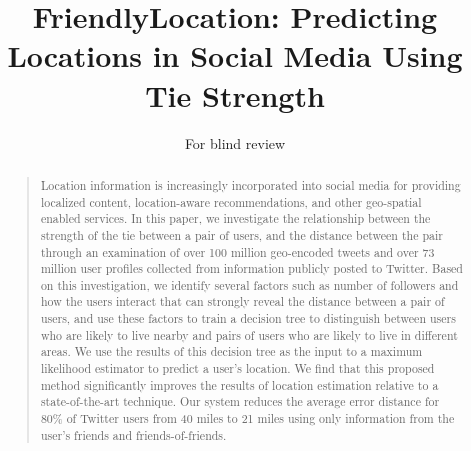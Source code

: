 \documentclass[letterpaper]{article}
\begin{document}
\title{FriendlyLocation: Predicting Locations in Social Media Using Tie Strength}
\author{For blind review}
\maketitle
\begin{abstract}
\begin{quote}
%
Location information is increasingly incorporated into social media for
providing localized content, location-aware recommendations, and other
geo-spatial enabled services.
%
In this paper, we investigate the relationship between the strength of the tie
between a pair of users, and the distance between the pair through an
examination of over 100 million geo-encoded tweets and
over 73 million user profiles collected from information publicly
posted to Twitter.
%
Based on this investigation, we identify several factors such as number of
followers and how the users interact that can strongly reveal the distance
between a pair of users, and use these factors to train a decision tree to
distinguish between users who are likely to live nearby and pairs of users who
are likely to live in different areas.
%
We use the results of this decision tree as the input to a maximum likelihood
estimator to predict a user's location.
%
We find that this proposed method significantly improves the results of
location estimation relative to a state-of-the-art technique.
%
Our system reduces the average error distance for 80\% of Twitter users from 40
miles to 21 miles using only information from the user's friends and
friends-of-friends.
\end{quote}
\end{abstract}







\end{document}
